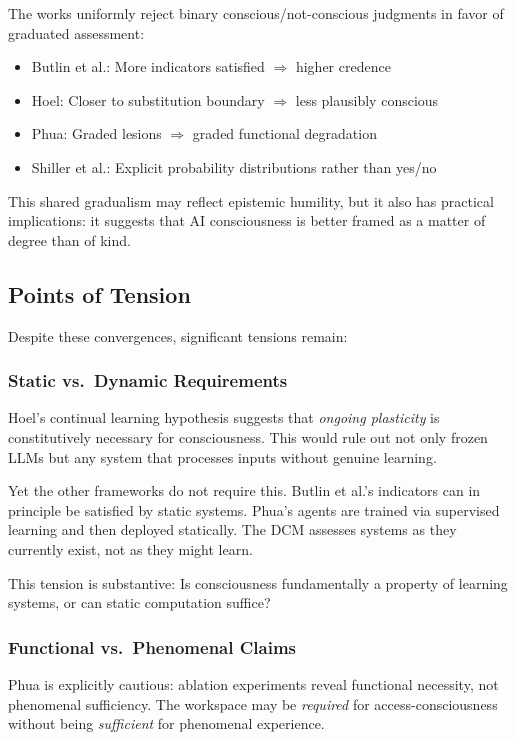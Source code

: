 The works uniformly reject binary conscious/not-conscious judgments in favor of graduated assessment:

\begin{itemize}
    \item Butlin et al.: More indicators satisfied $\Rightarrow$ higher credence
    \item Hoel: Closer to substitution boundary $\Rightarrow$ less plausibly conscious
    \item Phua: Graded lesions $\Rightarrow$ graded functional degradation
    \item Shiller et al.: Explicit probability distributions rather than yes/no
\end{itemize}

This shared gradualism may reflect epistemic humility, but it also has practical implications: it suggests that AI consciousness is better framed as a matter of degree than of kind.

\subsection{Points of Tension}

Despite these convergences, significant tensions remain:

\subsubsection{Static vs.\ Dynamic Requirements}

Hoel's continual learning hypothesis suggests that \emph{ongoing plasticity} is constitutively necessary for consciousness. This would rule out not only frozen LLMs but any system that processes inputs without genuine learning.

Yet the other frameworks do not require this. Butlin et al.'s indicators can in principle be satisfied by static systems. Phua's agents are trained via supervised learning and then deployed statically. The DCM assesses systems as they currently exist, not as they might learn.

This tension is substantive: Is consciousness fundamentally a property of learning systems, or can static computation suffice?

\subsubsection{Functional vs.\ Phenomenal Claims}

Phua is explicitly cautious: ablation experiments reveal functional necessity, not phenomenal sufficiency. The workspace may be \emph{required} for access-consciousness without being \emph{sufficient} for phenomenal experience.

